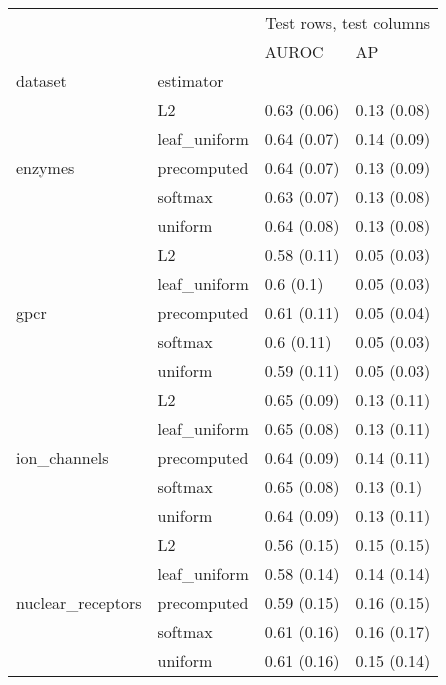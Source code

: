 \begin{tabular}{llll}
\toprule
 &  & \multicolumn{2}{r}{Test rows, test columns} \\
 &  & AUROC & AP \\
dataset & estimator &  &  \\
\midrule
\multirow[c]{5}{*}{enzymes} & L2 & 0.63 (0.06) & 0.13 (0.08) \\
 & leaf\_uniform & 0.64 (0.07) & 0.14 (0.09) \\
 & precomputed & 0.64 (0.07) & 0.13 (0.09) \\
 & softmax & 0.63 (0.07) & 0.13 (0.08) \\
 & uniform & 0.64 (0.08) & 0.13 (0.08) \\
\cline{1-2}
\multirow[c]{5}{*}{gpcr} & L2 & 0.58 (0.11) & 0.05 (0.03) \\
 & leaf\_uniform & 0.6 (0.1) & 0.05 (0.03) \\
 & precomputed & 0.61 (0.11) & 0.05 (0.04) \\
 & softmax & 0.6 (0.11) & 0.05 (0.03) \\
 & uniform & 0.59 (0.11) & 0.05 (0.03) \\
\cline{1-2}
\multirow[c]{5}{*}{ion\_channels} & L2 & 0.65 (0.09) & 0.13 (0.11) \\
 & leaf\_uniform & 0.65 (0.08) & 0.13 (0.11) \\
 & precomputed & 0.64 (0.09) & 0.14 (0.11) \\
 & softmax & 0.65 (0.08) & 0.13 (0.1) \\
 & uniform & 0.64 (0.09) & 0.13 (0.11) \\
\cline{1-2}
\multirow[c]{5}{*}{nuclear\_receptors} & L2 & 0.56 (0.15) & 0.15 (0.15) \\
 & leaf\_uniform & 0.58 (0.14) & 0.14 (0.14) \\
 & precomputed & 0.59 (0.15) & 0.16 (0.15) \\
 & softmax & 0.61 (0.16) & 0.16 (0.17) \\
 & uniform & 0.61 (0.16) & 0.15 (0.14) \\
\cline{1-2}
\bottomrule
\end{tabular}
